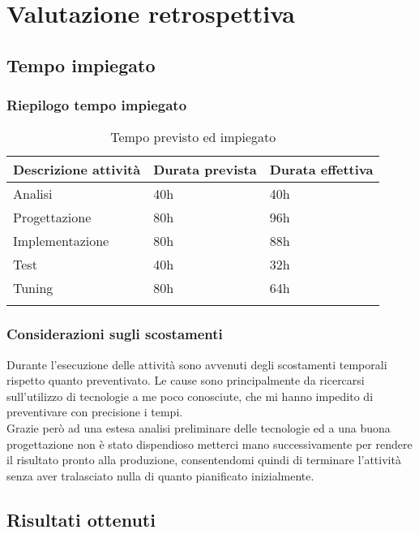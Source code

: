 \documentclass[Tesi.tex]{subfiles}
\begin{document}
\chapter{Valutazione retrospettiva}

\section{Tempo impiegato}

\subsection{Riepilogo tempo impiegato}
\label{table:Tempo previsto ed impiegato}
\renewcommand*{\arraystretch}{1.2}
\begin{longtable}[H]{p{6cm}p{3.5cm}p{3.5cm}}
	\rowcolor{CHeader}
	\color{CHeaderText} \textbf{Descrizione attivit\`{a}} & \color{CHeaderText} \textbf{Durata prevista} & \color{CHeaderText} \textbf{Durata effettiva} \\
	\endhead
		Analisi & 40h & 40h \\
		Progettazione & 80h & 96h \\
		Implementazione & 80h & 88h \\
		Test & 40h & 32h \\
		Tuning & 80h & 64h \\
	\hiderowcolors
	\caption{Tempo previsto ed impiegato}
\end{longtable}

\subsection{Considerazioni sugli scostamenti}
Durante l'esecuzione delle attività sono avvenuti degli scostamenti temporali rispetto quanto preventivato. Le cause sono principalmente da ricercarsi sull'utilizzo di tecnologie a me poco conosciute, che mi hanno impedito di preventivare con precisione i tempi. \\
Grazie però ad una estesa analisi preliminare delle tecnologie ed a una buona progettazione non è stato dispendioso metterci mano successivamente per rendere il risultato pronto alla produzione, consentendomi quindi di terminare l'attività senza aver tralasciato nulla di quanto pianificato inizialmente.

\section{Risultati ottenuti}
\end{document}
